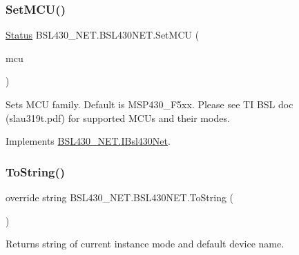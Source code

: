 \mbox{\label{class_b_s_l430___n_e_t_1_1_b_s_l430_n_e_t_a22d6c0af4298026d7939bc993e9791ad}} 
\subsubsection{\texorpdfstring{SetMCU()}{SetMCU()}}
{\footnotesize\ttfamily \mbox{\hyperlink{class_b_s_l430___n_e_t_1_1_status}{Status}} B\+S\+L430\+\_\+\+N\+E\+T.\+B\+S\+L430\+N\+E\+T.\+Set\+M\+CU (\begin{DoxyParamCaption}\item[{\mbox{\hyperlink{namespace_b_s_l430___n_e_t_a2cdaa65be7e1679fc8ca77610b19a490}{M\+CU}}}]{mcu }\end{DoxyParamCaption})}



Sets M\+CU family. Default is M\+S\+P430\+\_\+\+F5xx. Please see TI B\+SL doc (slau319t.\+pdf) for supported M\+C\+Us and their modes. 



Implements \mbox{\hyperlink{interface_b_s_l430___n_e_t_1_1_i_bsl430_net_ab73461fb74eb2d85fd06ece052558b0d}{B\+S\+L430\+\_\+\+N\+E\+T.\+I\+Bsl430\+Net}}.

\mbox{\label{class_b_s_l430___n_e_t_1_1_b_s_l430_n_e_t_ace5a0f8f3d3eb9b26279ae557ffa9505}} 
\subsubsection{\texorpdfstring{ToString()}{ToString()}}
{\footnotesize\ttfamily override string B\+S\+L430\+\_\+\+N\+E\+T.\+B\+S\+L430\+N\+E\+T.\+To\+String (\begin{DoxyParamCaption}{ }\end{DoxyParamCaption})}



Returns string of current instance mode and default device name. 

\mbox{\label{class_b_s_l430___n_e_t_1_1_b_s_l430_n_e_t_aaa54534dbbc4b9b255bffe5d6e29ba40}} 
